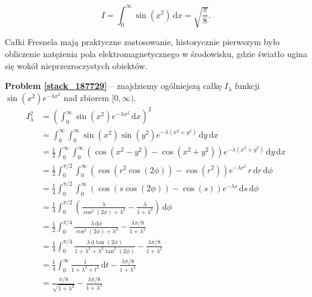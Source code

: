 %

\begin{problem_with_solution}
    \label{stack_187729}%
    \begin{equation}
        I = \int_0^\infty \sin (x^2) \,\mathrm{d} x = \sqrt{\frac \pi 8}.
    \end{equation}
\end{problem_with_solution}

Całki Fresnela mają praktyczne zastosowanie, historycznie pierwszym było obliczenie natężenia pola elektromagnetycznego w środowisku, gdzie światło ugina się wokół nieprzezroczystych obiektów.
%

\textbf{Problem \ref{stack_187729}} -- znajdziemy ogólniejszą całkę $I_\lambda$ funkcji $\sin(x^2) e^{-\lambda x^2}$ nad zbiorem $[0, \infty)$.
\begin{align}
    I_\lambda^2 & = \left(\int_0^\infty \sin(x^2) e^{-\lambda x^2} \,\mathrm{d}x \right)^2 \\
    & = \int_0^\infty \int_0^\infty \sin(x^2)\sin(y^2) e^{- \lambda(x^2+y^2)}\,\mathrm{d}y\,\mathrm{d}x \\
    & = \frac12 \int_0^\infty \int_0^\infty \left(\cos(x^2-y^2)-\cos(x^2+y^2)\right) e^{- \lambda(x^2+y^2)}\,\mathrm{d}y\,\mathrm{d}x \\
    & = \frac12 \int_0^{\pi/2} \int_0^\infty \left(\cos(r^2\cos(2\phi))-\cos(r^2)\right)e^{- \lambda r^2} \,r\,\mathrm{d}r\,\mathrm{d}\phi \\
    & = \frac14 \int_0^{\pi/2} \int_0^\infty \left(\cos(s\cos(2\phi))-\cos(s)\right) e^{- \lambda s} \,\mathrm{d}s\,\mathrm{d}\phi \\
    & = \frac14 \int_0^{\pi/2} \left( \frac{ \lambda}{\cos^2(2\phi)+ \lambda^2} - \frac{ \lambda}{1+ \lambda^2}\right)\,\mathrm{d}\phi \\
    & = \frac12 \int_0^{\pi/4} \frac{ \lambda\,\mathrm{d}\phi}{\cos^2(2\phi)+ \lambda^2} - \frac{ \lambda\pi/8}{1+ \lambda^2} \\
    & = \frac14 \int_0^{\pi/4} \frac{ \lambda\,\mathrm{d} \tan(2\phi)} {1+ \lambda^2+ \lambda^2 \tan^2(2\phi)} - \frac{ \lambda\pi/8}{1+ \lambda^2} \\
    & = \frac14 \int_0^\infty \frac1{1+ \lambda^2+t^2}\,\mathrm{d}t - \frac{ \lambda\pi/8}{1+ \lambda^2} \\
    & = \frac{\pi/8}{\sqrt{1+ \lambda^2}} - \frac{ \lambda\pi/8}{1+ \lambda^2}
\end{align}

%